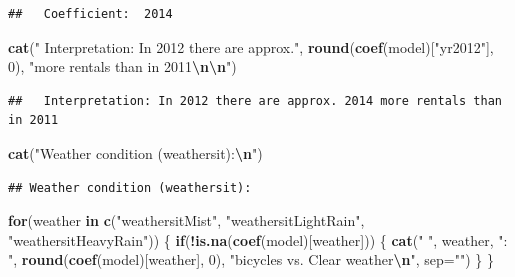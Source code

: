 \documentclass[
]{article}
\newenvironment{Shaded}{\begin{snugshade}}{\end{snugshade}}
\newcommand{\AttributeTok}[1]{\textcolor[rgb]{0.13,0.29,0.53}{#1}}
\newcommand{\ControlFlowTok}[1]{\textcolor[rgb]{0.13,0.29,0.53}{\textbf{#1}}}
\newcommand{\DecValTok}[1]{\textcolor[rgb]{0.00,0.00,0.81}{#1}}
\newcommand{\FunctionTok}[1]{\textcolor[rgb]{0.13,0.29,0.53}{\textbf{#1}}}
\newcommand{\NormalTok}[1]{#1}
\newcommand{\SpecialCharTok}[1]{\textcolor[rgb]{0.81,0.36,0.00}{\textbf{#1}}}
\newcommand{\StringTok}[1]{\textcolor[rgb]{0.31,0.60,0.02}{#1}}
\begin{document}
\begin{verbatim}
##   Coefficient:  2014
\end{verbatim}

\begin{Shaded}
\begin{Highlighting}[]
\FunctionTok{cat}\NormalTok{(}\StringTok{"  Interpretation: In 2012 there are approx."}\NormalTok{, }\FunctionTok{round}\NormalTok{(}\FunctionTok{coef}\NormalTok{(model)[}\StringTok{"yr2012"}\NormalTok{], }\DecValTok{0}\NormalTok{), }
    \StringTok{"more rentals than in 2011}\SpecialCharTok{\textbackslash{}n\textbackslash{}n}\StringTok{"}\NormalTok{)}
\end{Highlighting}
\end{Shaded}

\begin{verbatim}
##   Interpretation: In 2012 there are approx. 2014 more rentals than in 2011
\end{verbatim}

\begin{Shaded}
\begin{Highlighting}[]
\FunctionTok{cat}\NormalTok{(}\StringTok{"Weather condition (weathersit):}\SpecialCharTok{\textbackslash{}n}\StringTok{"}\NormalTok{)}
\end{Highlighting}
\end{Shaded}

\begin{verbatim}
## Weather condition (weathersit):
\end{verbatim}

\begin{Shaded}
\begin{Highlighting}[]
\ControlFlowTok{for}\NormalTok{(weather }\ControlFlowTok{in} \FunctionTok{c}\NormalTok{(}\StringTok{"weathersitMist"}\NormalTok{, }\StringTok{"weathersitLightRain"}\NormalTok{, }\StringTok{"weathersitHeavyRain"}\NormalTok{)) \{}
  \ControlFlowTok{if}\NormalTok{(}\SpecialCharTok{!}\FunctionTok{is.na}\NormalTok{(}\FunctionTok{coef}\NormalTok{(model)[weather])) \{}
    \FunctionTok{cat}\NormalTok{(}\StringTok{"  "}\NormalTok{, weather, }\StringTok{": "}\NormalTok{, }\FunctionTok{round}\NormalTok{(}\FunctionTok{coef}\NormalTok{(model)[weather], }\DecValTok{0}\NormalTok{), }
        \StringTok{"bicycles vs. Clear weather}\SpecialCharTok{\textbackslash{}n}\StringTok{"}\NormalTok{, }\AttributeTok{sep=}\StringTok{""}\NormalTok{)}
\NormalTok{  \}}
\NormalTok{\}}
\end{Highlighting}
\end{Shaded}
\end{document}
